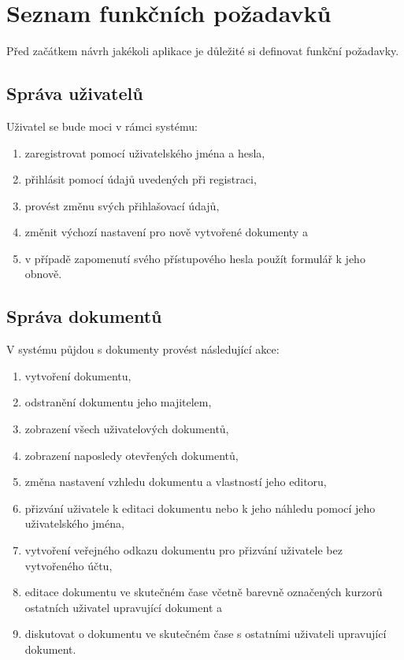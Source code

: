 
\section{Seznam funkčních požadavků}\label{sec:funcniPozadavky}
Před začátkem návrh jakékoli aplikace je důležité si definovat funkční požadavky.

\subsection{Správa uživatelů}\label{subsec:správaUživatelů}

Uživatel se bude moci v rámci systému:
\begin{enumerate}[label=F1.\arabic*.]
    \item zaregistrovat pomocí uživatelského jména a hesla,
    \item přihlásit pomocí údajů uvedených při registraci,
    \item provést změnu svých přihlašovací údajů,
    \item změnit výchozí nastavení pro nově vytvořené dokumenty a
    \item v případě zapomenutí svého přístupového hesla použít formulář k jeho obnově.
\end{enumerate}

\subsection{Správa dokumentů}\label{subsec:správaDokumentů}

V systému půjdou s dokumenty provést následující akce:
\begin{enumerate}[label=F2.\arabic*.]
    \item vytvoření dokumentu,
    \item odstranění dokumentu jeho majitelem,
    \item zobrazení všech uživatelových dokumentů,
    \item zobrazení naposledy otevřených dokumentů,
    \item změna nastavení vzhledu dokumentu a vlastností jeho editoru,
    \item přizvání uživatele k editaci dokumentu nebo k jeho náhledu pomocí jeho uživatelského jména,
    \item vytvoření veřejného odkazu dokumentu pro přizvání uživatele bez vytvořeného účtu,
    \item editace dokumentu ve skutečném čase včetně barevně označených kurzorů ostatních uživatel upravující dokument a
    \item diskutovat o dokumentu ve skutečném čase s ostatními uživateli upravující dokument.
\end{enumerate}

